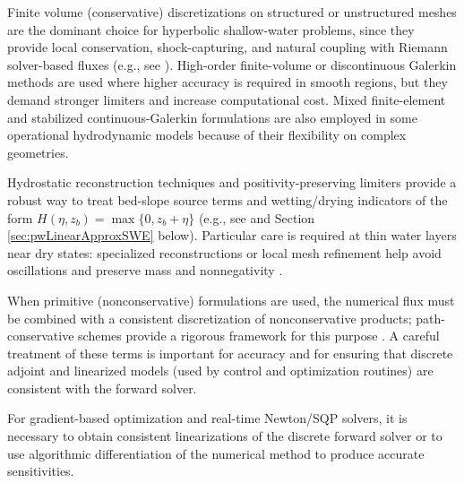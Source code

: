 \documentclass{article}
\newcommand{\1}{\mathds{1}}          %
\theoremstyle{definition}
\begin{document}
\begin{sloppypar}
Finite volume (conservative) discretizations on structured or unstructured meshes are the dominant choice for hyperbolic shallow-water problems, since they provide local conservation, shock-capturing, and natural coupling with Riemann solver-based fluxes (e.g., see \cite{LeVeque_2002,toro2009}). 
High-order finite-volume or discontinuous Galerkin methods are used where higher accuracy is required in smooth regions, but they demand stronger limiters and increase computational cost. Mixed finite-element and stabilized continuous-Galerkin formulations are also employed in some operational hydrodynamic models because of their flexibility on complex geometries.

Hydrostatic reconstruction techniques and positivity-preserving limiters provide a robust way to treat bed-slope source terms and wetting/drying indicators of the form $H(\eta,z_b)=\max\{0,z_b+\eta\}$ (e.g., see \cite{BrugnanoCasulli2008,BrugnanoCasulli2009} and Section \ref{sec:pwLinearApproxSWE} below). Particular care is required at thin water layers near dry states: specialized reconstructions or local mesh refinement help avoid oscillations and preserve mass and nonnegativity \cite{kurganov2007}.

When primitive (nonconservative) formulations are used, the numerical flux must be combined with a consistent discretization of nonconservative products; path-conservative schemes provide a rigorous framework for this purpose \cite{pares2006,castro2019}. A careful treatment of these terms is important for accuracy and for ensuring that discrete adjoint and linearized models (used by control and optimization routines) are consistent with the forward solver.

For gradient-based optimization and real-time Newton/SQP solvers, it is necessary to obtain consistent linearizations of the discrete forward solver or to use algorithmic differentiation of the numerical method to produce accurate sensitivities.


\end{sloppypar}
\end{document}
